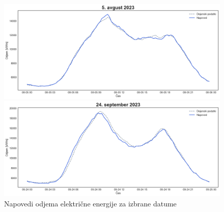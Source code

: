 \documentclass[a4paper, 11pt]{article}
\begin{document}
\begin{figure}[!ht]
    \centering
    \caption{Napovedi odjema električne energije za izbrane datume}\par\medskip
    \label{fig:napovedi_vse}
    \begin{minipage}[c]{0.48\linewidth}
        \includegraphics[width=\linewidth]{napoved_1.png}
    \end{minipage}
    \hfill
    \begin{minipage}[c]{0.48\linewidth}
        \includegraphics[width=\linewidth]{napoved_2.png}
    \end{minipage}
\end{figure}
\end{document}
